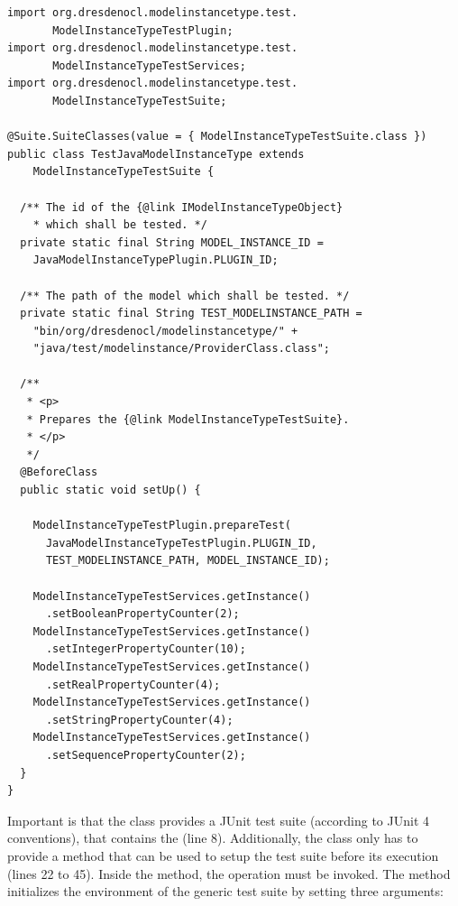 \lstset{
  language=Java
}
\begin{lstlisting}[caption={An instantiation of the generic model instance test suite.}, captionpos=b, label=list:modelInstanceTestSuite:constraints01, float]
import org.dresdenocl.modelinstancetype.test.
       ModelInstanceTypeTestPlugin;
import org.dresdenocl.modelinstancetype.test.
       ModelInstanceTypeTestServices;
import org.dresdenocl.modelinstancetype.test.
       ModelInstanceTypeTestSuite;

@Suite.SuiteClasses(value = { ModelInstanceTypeTestSuite.class })
public class TestJavaModelInstanceType extends 
    ModelInstanceTypeTestSuite {

  /** The id of the {@link IModelInstanceTypeObject} 
    * which shall be tested. */
  private static final String MODEL_INSTANCE_ID =
    JavaModelInstanceTypePlugin.PLUGIN_ID;

  /** The path of the model which shall be tested. */
  private static final String TEST_MODELINSTANCE_PATH =
    "bin/org/dresdenocl/modelinstancetype/" +
    "java/test/modelinstance/ProviderClass.class";

  /**
   * <p>
   * Prepares the {@link ModelInstanceTypeTestSuite}.
   * </p>
   */
  @BeforeClass
  public static void setUp() {

    ModelInstanceTypeTestPlugin.prepareTest(
      JavaModelInstanceTypeTestPlugin.PLUGIN_ID, 
      TEST_MODELINSTANCE_PATH, MODEL_INSTANCE_ID);

    ModelInstanceTypeTestServices.getInstance()
      .setBooleanPropertyCounter(2);
    ModelInstanceTypeTestServices.getInstance()
      .setIntegerPropertyCounter(10);
    ModelInstanceTypeTestServices.getInstance()
      .setRealPropertyCounter(4);
    ModelInstanceTypeTestServices.getInstance()
      .setStringPropertyCounter(4);
    ModelInstanceTypeTestServices.getInstance()
      .setSequencePropertyCounter(2);
  }
}
\end{lstlisting}

Important is that the class provides a JUnit test suite (according to JUnit 4 
conventions), that contains the  (line 8). 
Additionally, the class only has to provide a  method that can be 
used to setup the test suite before its execution (lines 22 to 45). Inside the 
 method, the operation 
 must be 
invoked. The method initializes the environment of the generic test suite by 
setting three arguments:

